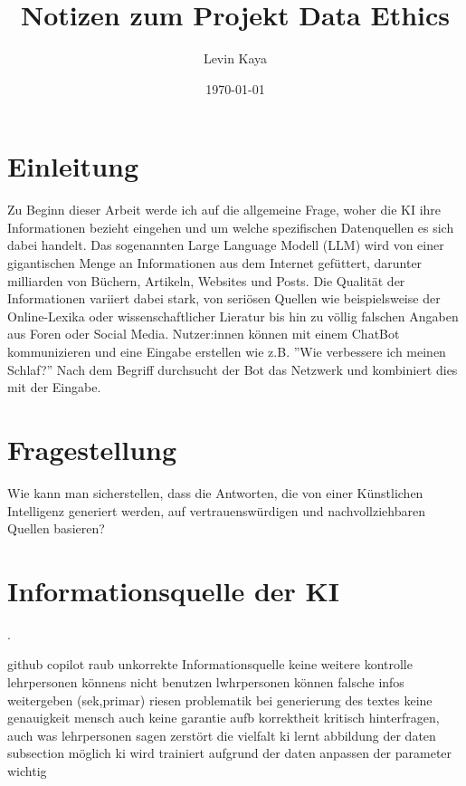 \documentclass{article}
\title{Notizen zum Projekt Data Ethics}
\author{Levin Kaya}
\date{\today}
\begin{document}
\maketitle


\tableofcontents

\section{Einleitung}
Zu Beginn dieser Arbeit werde ich auf die allgemeine Frage, woher die KI ihre Informationen bezieht eingehen und um welche spezifischen Datenquellen es sich dabei handelt. 
Das sogenannten Large Language Modell (LLM) wird von einer gigantischen Menge an Informationen aus dem Internet gefüttert, darunter milliarden von Büchern, Artikeln, Websites und Posts. Die Qualität der Informationen variiert dabei stark, von seriösen Quellen wie beispielsweise der Online-Lexika oder wissenschaftlicher Lieratur bis hin zu völlig falschen Angaben aus Foren oder Social Media. Nutzer:innen können mit einem ChatBot kommunizieren und eine Eingabe erstellen wie z.B. ''Wie verbessere ich meinen Schlaf?'' Nach dem Begriff durchsucht der Bot das Netzwerk und kombiniert dies mit der Eingabe.



\section{Fragestellung}
Wie kann man sicherstellen, dass die Antworten, die von einer Künstlichen Intelligenz generiert werden, auf vertrauenswürdigen und nachvollziehbaren Quellen basieren?


\section{Informationsquelle der KI}

.







github copilot
raub
unkorrekte Informationsquelle
keine weitere kontrolle
lehrpersonen könnens nicht benutzen
lwhrpersonen können falsche infos weitergeben (sek,primar)
riesen problematik
bei generierung des textes keine genauigkeit
mensch auch keine garantie aufb korrektheit
kritisch hinterfragen, auch was lehrpersonen sagen
zerstört die vielfalt
ki lernt abbildung der daten
subsection möglich
ki wird trainiert aufgrund der daten
anpassen der parameter wichtig
\printbibliography
\end{document}
